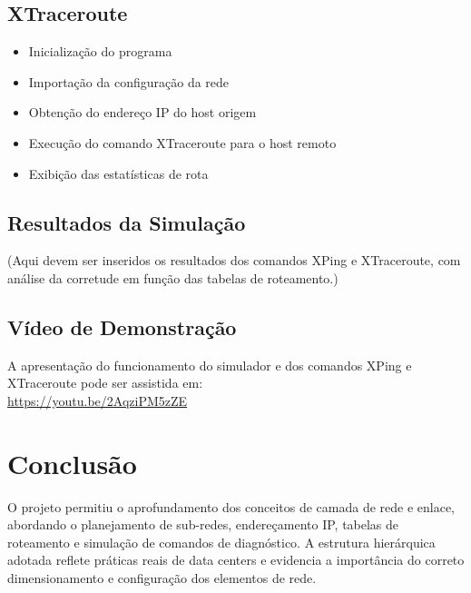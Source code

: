 \documentclass[conference,compsoc]{IEEEtran}
\begin{document}
\begin{otherlanguage}{brazil}
\subsection{XTraceroute}
\begin{itemize}
    \item Inicialização do programa
    \item Importação da configuração da rede
    \item Obtenção do endereço IP do host origem
    \item Execução do comando XTraceroute para o host remoto
    \item Exibição das estatísticas de rota
\end{itemize}

\subsection{Resultados da Simulação}

(Aqui devem ser inseridos os resultados dos comandos XPing e XTraceroute, com análise da corretude em função das tabelas de roteamento.)

\subsection{Vídeo de Demonstração}

A apresentação do funcionamento do simulador e dos comandos XPing e XTraceroute pode ser assistida em: \\ 
\url{https://youtu.be/2AqziPM5zZE}

\section{Conclusão}

O projeto permitiu o aprofundamento dos conceitos de camada de rede e enlace, abordando o planejamento de sub-redes, endereçamento IP, tabelas de roteamento e simulação de comandos de diagnóstico. A estrutura hierárquica adotada reflete práticas reais de data centers e evidencia a importância do correto dimensionamento e configuração dos elementos de rede.



\end{otherlanguage}
\end{document}
